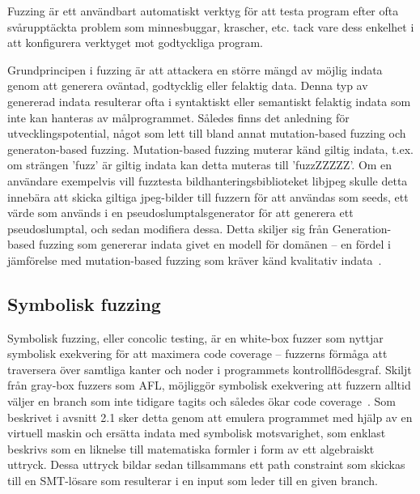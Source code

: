Fuzzing är ett användbart automatiskt verktyg för att testa program efter ofta
svårupptäckta problem som minnesbuggar, krascher, etc. tack vare dess enkelhet i
att konfigurera verktyget mot godtyckliga program.  

Grundprincipen i fuzzing är att attackera en större mängd av möjlig indata genom
att generera oväntad, godtycklig eller felaktig data. Denna typ av genererad
indata resulterar ofta i syntaktiskt eller semantiskt felaktig indata som inte
kan hanteras av målprogrammet. Således finns det anledning för
utvecklingspotential, något som lett till bland annat mutation-based fuzzing och
generaton-based fuzzing. Mutation-based fuzzing muterar känd giltig indata,
t.ex. om strängen 'fuzz' är giltig indata kan detta muteras till 'fuzzZZZZZ'. Om
en användare exempelvis vill fuzztesta bildhanteringsbiblioteket libjpeg skulle
detta innebära att skicka giltiga jpeg-bilder till fuzzern för att användas som
seeds, ett värde som används i en pseudoslumptalsgenerator för att generera ett
pseudoslumptal, och sedan modifiera dessa. Detta skiljer sig från
Generation-based fuzzing som genererar indata givet en modell för domänen -- en
fördel i jämförelse med mutation-based fuzzing som kräver känd kvalitativ
indata~\cite{fuzzing}. 

\subsection{Symbolisk fuzzing} Symbolisk fuzzing, eller concolic testing, är en
white-box fuzzer som nyttjar symbolisk exekvering för att maximera code coverage
-- fuzzerns förmåga att traversera över samtliga kanter och noder i programmets
kontrollflödesgraf. Skiljt från gray-box fuzzers som AFL, möjliggör symbolisk
exekvering att fuzzern alltid väljer en branch som inte tidigare tagits och
således ökar code coverage~\cite{challenges_fuzzing}. Som beskrivet i avsnitt
2.1 sker detta genom att emulera programmet med hjälp av en virtuell maskin och
ersätta indata med symbolisk motsvarighet, som enklast beskrivs som en liknelse
till matematiska formler i form av ett algebraiskt uttryck. Dessa uttryck bildar
sedan tillsammans ett path constraint som skickas till en SMT-lösare som
resulterar i en input som leder till en given branch. 

